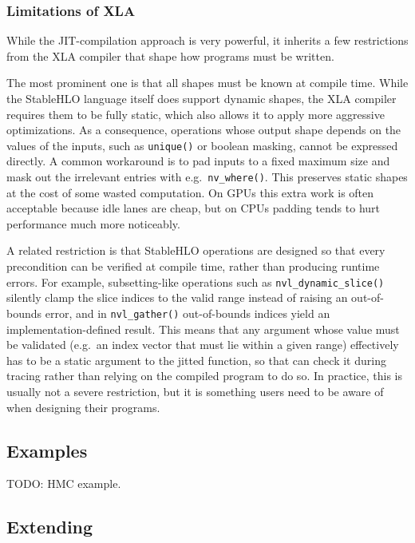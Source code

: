 \subsubsection{Limitations of XLA}\label{limitations-of-xla}

While the JIT-compilation approach is very powerful, it inherits a few restrictions from the XLA compiler that shape how programs must be written.

The most prominent one is that all shapes must be known at compile time.
While the StableHLO language itself does support dynamic shapes, the XLA compiler requires them to be fully static, which also allows it to apply more aggressive optimizations.
As a consequence, operations whose output shape depends on the values of the inputs, such as \texttt{unique()} or boolean masking, cannot be expressed directly.
A common workaround is to pad inputs to a fixed maximum size and mask out the irrelevant entries with e.g.~\texttt{nv\_where()}.
This preserves static shapes at the cost of some wasted computation.
On GPUs this extra work is often acceptable because idle lanes are cheap, but on CPUs padding tends to hurt performance much more noticeably.

A related restriction is that StableHLO operations are designed so that every precondition can be verified at compile time, rather than producing runtime errors.
For example, subsetting-like operations such as \texttt{nvl\_dynamic\_slice()} silently clamp the slice indices to the valid range instead of raising an out-of-bounds error, and in \texttt{nvl\_gather()} out-of-bounds indices yield an implementation-defined result.
This means that any argument whose value must be validated (e.g.~an index vector that must lie within a given range) effectively has to be a static argument to the jitted function, so that  can check it during tracing rather than relying on the compiled program to do so.
In practice, this is usually not a severe restriction, but it is something users need to be aware of when designing their programs.

\subsection{Examples}\label{examples}

TODO: HMC example.

\subsection{Extending}\label{extending}

